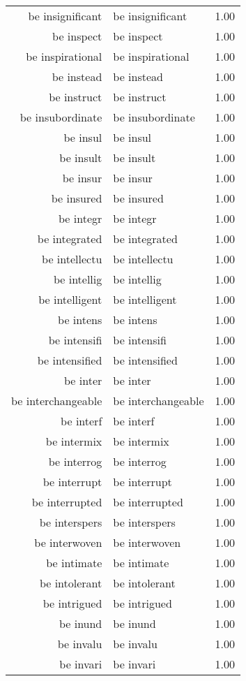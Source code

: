 \begin{table}[ht]
\begin{tabular}{rlr}
  be insignificant & be insignificant & 1.00 \\ 
  be inspect & be inspect & 1.00 \\ 
  be inspirational & be inspirational & 1.00 \\ 
  be instead & be instead & 1.00 \\ 
  be instruct & be instruct & 1.00 \\ 
  be insubordinate & be insubordinate & 1.00 \\ 
  be insul & be insul & 1.00 \\ 
  be insult & be insult & 1.00 \\ 
  be insur & be insur & 1.00 \\ 
  be insured & be insured & 1.00 \\ 
  be integr & be integr & 1.00 \\ 
  be integrated & be integrated & 1.00 \\ 
  be intellectu & be intellectu & 1.00 \\ 
  be intellig & be intellig & 1.00 \\ 
  be intelligent & be intelligent & 1.00 \\ 
  be intens & be intens & 1.00 \\ 
  be intensifi & be intensifi & 1.00 \\ 
  be intensified & be intensified & 1.00 \\ 
  be inter & be inter & 1.00 \\ 
  be interchangeable & be interchangeable & 1.00 \\ 
  be interf & be interf & 1.00 \\ 
  be intermix & be intermix & 1.00 \\ 
  be interrog & be interrog & 1.00 \\ 
  be interrupt & be interrupt & 1.00 \\ 
  be interrupted & be interrupted & 1.00 \\ 
  be interspers & be interspers & 1.00 \\ 
  be interwoven & be interwoven & 1.00 \\ 
  be intimate & be intimate & 1.00 \\ 
  be intolerant & be intolerant & 1.00 \\ 
  be intrigued & be intrigued & 1.00 \\ 
  be inund & be inund & 1.00 \\ 
  be invalu & be invalu & 1.00 \\ 
  be invari & be invari & 1.00 \\ 

\end{tabular}
\end{table}
